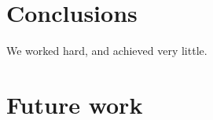 \documentclass[a4paper
               ,10pt
               ,DIV=10 %
               ,BCOR=0.3cm
               ,pagesize %
               ,headings=small
               ,bibtotoc
               ]
               {scrartcl}
\begin{document}
\section{Conclusions}\label{conclusions}
We worked hard, and achieved very little.

\section{Future work}



\end{document}
